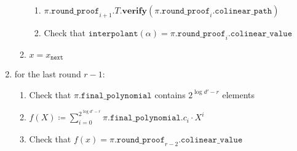 \begin{algorithm}[H]
\begin{enumerate}
\begin{enumerate}
\begin{enumerate}
			\item $\pi.\texttt{round\_proof}_{i + 1}.T.\textbf{verify}(\pi.\texttt{round\_proof}_{i}.\texttt{colinear\_path})$
			\item Check that $\texttt{interpolant}(\alpha) = \pi.\texttt{round\_proof}_{i}.\texttt{colinear\_value}$
		\end{enumerate}
		\item $x = x_{\texttt{next}}$
	\end{enumerate}
	\item for the last round $r - 1$:
	\begin{enumerate} 
		\item Check that $\pi.\texttt{final\_polynomial}$ contains $2^{\log d' - r}$ elements
		\item $f(X) \coloneqq \sum_{i = 0}^{2^{\log d' - r}}\pi.\texttt{final\_polynomial}.c_i \cdot X^i$
		\item Check that $f(x) = \pi.\texttt{round\_proof}_{r - 2}.\texttt{colinear\_value}$
	\end{enumerate}
\end{enumerate}
\end{algorithm}
